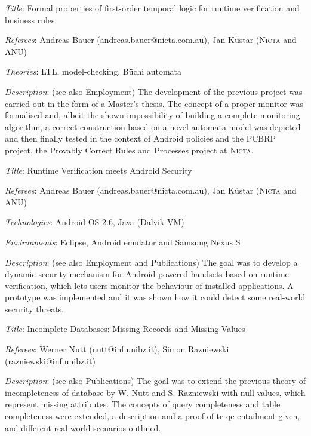 \documentclass[letterpaper]{article}
\renewenvironment{itemize}{
  \begin{list}{}{
    \setlength{\leftmargin}{1.5em}
  }
}{
  \end{list}
}
\newenvironment{itemize1}{
  \begin{list}{}{
    \setlength{\leftmargin}{0em}
  }
}{
  \end{list}
}
\begin{document}
\begin{itemize1}
\item
\begin{itemize}
\item {\it Title}: Formal properties of first-order temporal logic for runtime verification and business rules 
\item {\it Referees}: Andreas Bauer (andreas.bauer@nicta.com.au), Jan K\"{u}star (\textsc{Nicta} and ANU)
\item {\it Theories}: LTL, model-checking, B\"uchi automata
\item {\it Description}: (see also Employment) The development of the previous project was carried out in the form of a Master's thesis. The concept of a proper monitor was formalised and, albeit the shown impossibility of building a complete monitoring algorithm, a correct construction based on a novel automata model was depicted and then finally tested in the context of Android policies and the PCBRP project, the Provably Correct Rules and Processes project at \textsc{Nicta}.
\end{itemize}

\bigskip
\item
\begin{itemize}
\item {\it Title}: Runtime Verification meets Android Security 
\item {\it Referees}: Andreas Bauer (andreas.bauer@nicta.com.au), Jan K\"{u}star (\textsc{Nicta} and ANU)
\item {\it Technologies}: Android OS 2.6, Java (Dalvik VM)
\item {\it Environments}: Eclipse, Android emulator and Samsung Nexus S
\item {\it Description}: (see also Employment and Publications) The goal was to develop a dynamic security mechanism for Android-powered handsets based on runtime verification, which lets users monitor the behaviour of installed applications. A prototype was implemented and it was shown how it could detect some real-world security threats.
\end{itemize}

\bigskip
\item
\begin{itemize}
\item {\it Title}: Incomplete Databases: Missing Records and Missing Values
\item {\it Referees}: Werner Nutt (nutt@inf.unibz.it), Simon Razniewski (razniewski@inf.unibz.it)
\item {\it Description}: (see also Publications) The goal was to extend the previous theory of incompleteness of database by W. Nutt and S. Razniewski with null values, which represent missing attributes. The concepts of query completeness and table completeness were extended, a description and a proof of tc-qc entailment given, and different real-world scenarios outlined. 
\end{itemize}


\end{itemize1}
\end{document}
